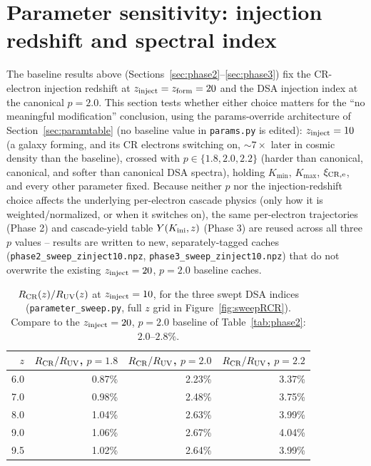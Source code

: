 \documentclass[11pt,a4paper]{article}
\newcommand{\Kini}{K_{\rm ini}}
\begin{document}
\section{Parameter sensitivity: injection redshift and spectral index}
\label{sec:sweep}

The baseline results above (Sections~\ref{sec:phase2}--\ref{sec:phase3}) fix the CR-electron
injection redshift at $z_{\rm inject}=z_{\rm form}=20$ and the DSA injection index at the
canonical $p=2.0$. This section tests whether either choice matters for the ``no meaningful
modification'' conclusion, using the params-override architecture of Section~\ref{sec:paramtable}
(no baseline value in \texttt{params.py} is edited): $z_{\rm inject}=10$ (a galaxy forming, and
its CR electrons switching on, $\sim7\times$ later in cosmic density than the baseline), crossed
with $p\in\{1.8,2.0,2.2\}$ (harder than canonical, canonical, and softer than canonical DSA
spectra), holding $K_{\min}$, $K_{\max}$, $\xi_{\rm CR,e}$, and every other parameter fixed.
Because neither $p$ nor the injection-redshift choice affects the underlying per-electron
cascade physics (only how it is weighted/normalized, or when it switches on), the same
per-electron trajectories (Phase 2) and cascade-yield table $Y(\Kini,z)$ (Phase 3) are reused
across all three $p$ values -- results are written to new, separately-tagged caches
(\texttt{phase2\_sweep\_zinject10.npz}, \texttt{phase3\_sweep\_zinject10.npz}) that do not
overwrite the existing $z_{\rm inject}=20$, $p=2.0$ baseline caches.

\begin{table}[H]
\centering\small
\begin{tabular}{@{}rrrr@{}}
\toprule
$z$ & $R_{\rm CR}/R_{\rm UV}$, $p=1.8$ & $R_{\rm CR}/R_{\rm UV}$, $p=2.0$ & $R_{\rm CR}/R_{\rm UV}$, $p=2.2$ \\
\midrule
6.0 & 0.87\% & 2.23\% & 3.37\% \\
7.0 & 0.98\% & 2.48\% & 3.75\% \\
8.0 & 1.04\% & 2.63\% & 3.99\% \\
9.0 & 1.06\% & 2.67\% & 4.04\% \\
9.5 & 1.02\% & 2.64\% & 3.99\% \\
\bottomrule
\end{tabular}
\caption{$R_{\rm CR}(z)/R_{\rm UV}(z)$ at $z_{\rm inject}=10$, for the three swept DSA
indices (\texttt{parameter\_sweep.py}, full $z$ grid in Figure~\ref{fig:sweepRCR}). Compare
to the $z_{\rm inject}=20$, $p=2.0$ baseline of Table~\ref{tab:phase2}: $2.0$--$2.8\%$.}
\label{tab:sweep2}
\end{table}
\end{document}
